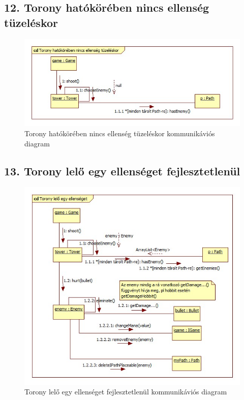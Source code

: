 \subsection{12. Torony hatókörében nincs ellenség tüzeléskor}
\begin{figure}[H]
\begin{center}
\includegraphics[width=17cm]{chapters/chapter05/images/cd_Torony_hatokoreben_nincs_ellenseg_tuzeleskor.jpg}
\caption{Torony hatókörében nincs ellenség tüzeléskor kommunikáviós diagram}
\label{fig:cd_Torony_hatokoreben_nincs_ellenseg_tuzeleskor}
\end{center}
\end{figure}

\subsection{13. Torony lelő egy ellenséget fejlesztetlenül}
\begin{figure}[H]
\begin{center}
\includegraphics[width=17cm]{chapters/chapter05/images/cd_Torony_lelo_egy_ellenseget_fejlesztetlenul.jpg}
\caption{Torony lelő egy ellenséget fejlesztetlenül kommunikáviós diagram}
\label{fig:cd_Torony_lelo_egy_ellenseget_fejlesztetlenul}
\end{center}
\end{figure}

